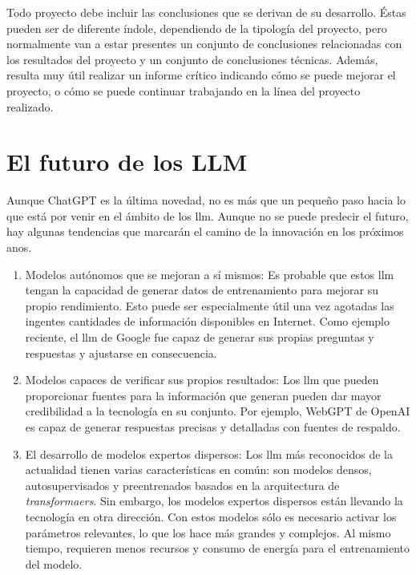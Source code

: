 
Todo proyecto debe incluir las conclusiones que se derivan de su desarrollo. Éstas pueden ser de diferente índole, dependiendo de la tipología del proyecto, pero normalmente van a estar presentes un conjunto de conclusiones relacionadas con los resultados del proyecto y un conjunto de conclusiones técnicas. 
Además, resulta muy útil realizar un informe crítico indicando cómo se puede mejorar el proyecto, o cómo se puede continuar trabajando en la línea del proyecto realizado. 

\section{El futuro de los LLM }

Aunque ChatGPT es la última novedad, no es más que un pequeño paso hacia lo que está por venir en el ámbito de los \acrshort{llm}. Aunque no se puede predecir el futuro, hay algunas tendencias que marcarán el camino de la innovación en los próximos anos\cite{Tolaka}.

\begin{enumerate}
    
\item Modelos autónomos que se mejoran a sí mismos: Es probable que estos \acrshort{llm} tengan la capacidad de generar datos de entrenamiento para mejorar su propio rendimiento. Esto puede ser especialmente útil una vez agotadas las ingentes cantidades de información disponibles en Internet. Como ejemplo reciente, el \acrshort{llm} de Google fue capaz de generar sus propias preguntas y respuestas y ajustarse en consecuencia.

\item Modelos capaces de verificar sus propios resultados: Los \acrshort{llm} que pueden proporcionar fuentes para la información que generan pueden dar mayor credibilidad a la tecnología en su conjunto. Por ejemplo, WebGPT de OpenAI es capaz de generar respuestas precisas y detalladas con fuentes de respaldo.

\item El desarrollo de modelos expertos dispersos: Los \acrshort{llm} más reconocidos de la actualidad tienen varias características en común: son modelos densos, autosupervisados y preentrenados basados en la arquitectura de \textit{transformaers}. Sin embargo, los modelos expertos dispersos están llevando la tecnología en otra dirección. Con estos modelos sólo es necesario activar los parámetros relevantes, lo que los hace más grandes y complejos. Al mismo tiempo, requieren menos recursos y consumo de energía para el entrenamiento del modelo.

\end{enumerate}